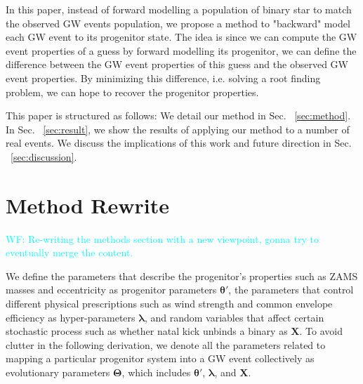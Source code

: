 \documentclass[twocolumn]{aastex631}
\newcommand{\wf}[1]{\textcolor{cyan}{WF: #1}}
\begin{document}
In this paper, instead of forward modelling a population of binary star to match the observed GW events population,
we propose a method to "backward" model each GW event to its progenitor state.
The idea is since we can compute the GW event properties of a guess by forward modelling its progenitor,
we can define the difference between the GW event properties of this guess and the observed GW event properties.
By minimizing this difference, i.e. solving a root finding problem, we can hope to recover the progenitor properties.

This paper is structured as follows: We detail our method in Sec. ~\ref{sec:method}.
In Sec. ~\ref{sec:result}, we show the results of applying our method to a number of real events.
We discuss the implications of this work and future direction in Sec. ~\ref{sec:discussion}.

\section{Method Rewrite}
\label{sec:method-rewrite}

\wf{Re-writing the methods section with a new viewpoint, gonna try to eventually merge the content.}

We define the parameters that describe the progenitor's properties such as ZAMS
masses and eccentricity as progenitor parameters $\bm{\theta'}$, the parameters
that control different physical prescriptions such as wind strength and common
envelope efficiency as hyper-parameters $\bm{\lambda}$, and random variables
that affect certain stochastic process such as whether natal kick unbinds a
binary as $\bm{X}$. To avoid clutter in the following derivation, we denote all
the parameters related to mapping a particular progenitor system into a GW event
collectively as evolutionary parameters $\bm{\Theta}$, which includes
$\bm{\theta'}$, $\bm{\lambda}$, and $\bm{X}$.
\end{document}

